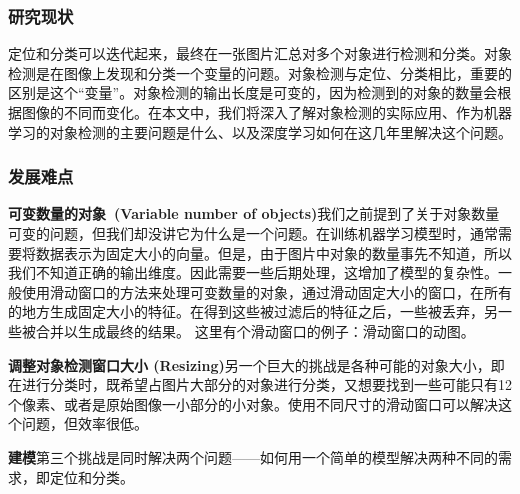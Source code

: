 \subsubsection{研究现状}
定位和分类可以迭代起来，最终在一张图片汇总对多个对象进行检测和分类。对象检测是在图像上发现和分类一个变量的问题。对象检测与定位、分类相比，重要的区别是这个“变量”。对象检测的输出长度是可变的，因为检测到的对象的数量会根据图像的不同而变化。在本文中，我们将深入了解对象检测的实际应用、作为机器学习的对象检测的主要问题是什么、以及深度学习如何在这几年里解决这个问题。

\subsubsection{发展难点}
\textbf{可变数量的对象 (Variable number of objects)}我们之前提到了关于对象数量可变的问题，但我们却没讲它为什么是一个问题。在训练机器学习模型时，通常需要将数据表示为固定大小的向量。但是，由于图片中对象的数量事先不知道，所以我们不知道正确的输出维度。因此需要一些后期处理，这增加了模型的复杂性。一般使用滑动窗口的方法来处理可变数量的对象，通过滑动固定大小的窗口，在所有的地方生成固定大小的特征。在得到这些被过滤后的特征之后，一些被丢弃，另一些被合并以生成最终的结果。
这里有个滑动窗口的例子：滑动窗口的动图。

\textbf{调整对象检测窗口大小 (Resizing)}另一个巨大的挑战是各种可能的对象大小，即在进行分类时，既希望占图片大部分的对象进行分类，又想要找到一些可能只有12个像素、或者是原始图像一小部分的小对象。使用不同尺寸的滑动窗口可以解决这个问题，但效率很低。

\textbf{建模}第三个挑战是同时解决两个问题——如何用一个简单的模型解决两种不同的需求，即定位和分类。
